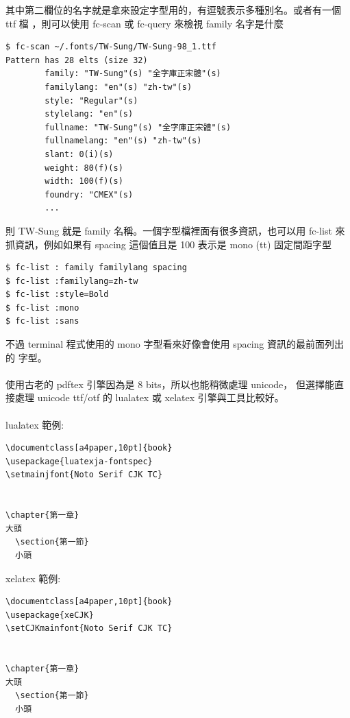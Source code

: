 其中第二欄位的名字就是拿來設定字型用的，有逗號表示多種別名。或者有一個 ttf 檔
，則可以使用 fc-scan 或 fc-query 來檢視 family 名字是什麼
\begin{verbatim}
$ fc-scan ~/.fonts/TW-Sung/TW-Sung-98_1.ttf
Pattern has 28 elts (size 32)
        family: "TW-Sung"(s) "全字庫正宋體"(s)
        familylang: "en"(s) "zh-tw"(s)
        style: "Regular"(s)
        stylelang: "en"(s)
        fullname: "TW-Sung"(s) "全字庫正宋體"(s)
        fullnamelang: "en"(s) "zh-tw"(s)
        slant: 0(i)(s)
        weight: 80(f)(s)
        width: 100(f)(s)
        foundry: "CMEX"(s)
        ...
\end{verbatim}
則 TW-Sung 就是 family 名稱。一個字型檔裡面有很多資訊，也可以用 fc-list 來
抓資訊，例如如果有 spacing 這個值且是 100 表示是 mono (tt) 固定間距字型
\begin{verbatim}
$ fc-list : family familylang spacing
$ fc-list :familylang=zh-tw
$ fc-list :style=Bold
$ fc-list :mono
$ fc-list :sans
\end{verbatim}
不過 terminal 程式使用的 mono 字型看來好像會使用 spacing 資訊的最前面列出的
字型。
\\\\
使用古老的 pdftex 引擎因為是 8 bits，所以也能稍微處理 unicode，
但選擇能直接處理 unicode ttf/otf 的 lualatex 或 xelatex 引擎與工具比較好。
\\\\
lualatex 範例:

\begin{verbatim}
\documentclass[a4paper,10pt]{book}
\usepackage{luatexja-fontspec}
\setmainjfont{Noto Serif CJK TC}


\chapter{第一章}
大頭
  \section{第一節}
  小頭

\end{verbatim}

xelatex 範例:

\begin{verbatim}
\documentclass[a4paper,10pt]{book}
\usepackage{xeCJK}
\setCJKmainfont{Noto Serif CJK TC}


\chapter{第一章}
大頭
  \section{第一節}
  小頭

\end{verbatim}

